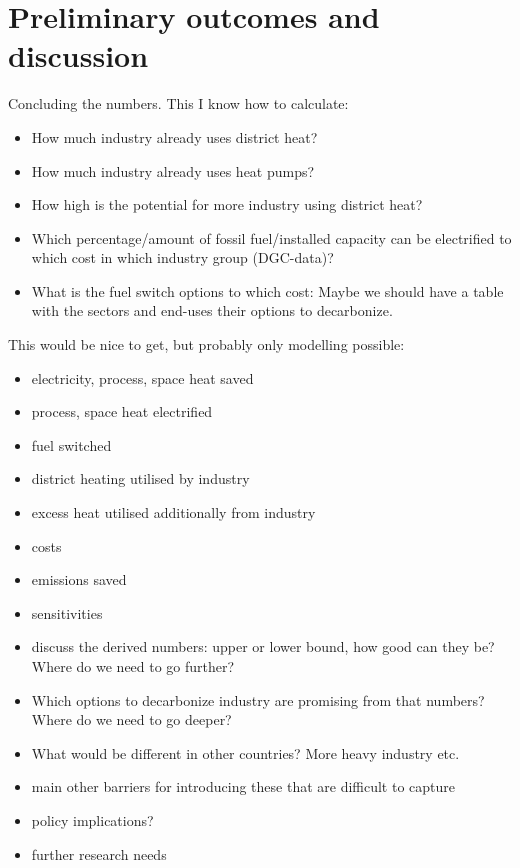 \documentclass[review]{elsarticle}
\begin{document}

\section{Preliminary outcomes and discussion} \label{outcdisc}
Concluding the numbers. This I know how to calculate:
\begin{itemize}
    \item How much industry already uses district heat?
    \item How much industry already uses heat pumps?
    \item How high is the potential for more industry using district heat?
    \item Which percentage/amount of fossil fuel/installed capacity can be electrified to which cost in which industry group (DGC-data)?
    \item What is the fuel switch options to which cost: Maybe we should have a table with the sectors and end-uses their options to decarbonize.
\end{itemize}
This would be nice to get, but probably only modelling possible:
\begin{itemize}
    \item electricity, process, space heat saved
    \item process, space heat electrified
    \item fuel switched
    \item district heating utilised by industry
    \item excess heat utilised additionally from industry
    \item costs
    \item emissions saved
    \item sensitivities
\end{itemize}

\begin{itemize}
    \item discuss the derived numbers: upper or lower bound, how good can they be? Where do we need to go further?
    \item Which options to decarbonize industry are promising from that numbers? Where do we need to go deeper?
    \item What would be different in other countries? More heavy industry etc.
    \item main other barriers for introducing these that are difficult to capture
    \item policy implications?
    \item further research needs
\end{itemize}
\end{document}

